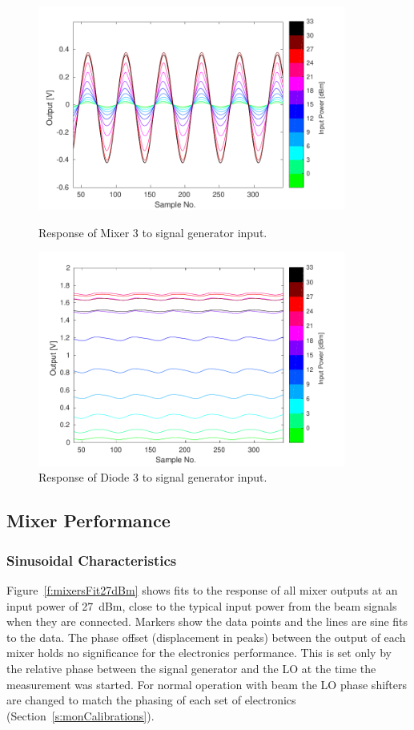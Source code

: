 \begin{figure}
  \centering
  \includegraphics[width=0.9\textwidth]{Figures/phaseMons/Mixer3_AllPowerLevels}
  \caption{Response of Mixer 3 to signal generator input.}
  \label{f:sigGenAllMix3}
  \includegraphics[width=0.9\textwidth]{Figures/phaseMons/Diode3_AllPowerLevels}
  \caption{Response of Diode 3 to signal generator input.}
  \label{f:sigGenAllDio3}
\end{figure}

\subsection{Mixer Performance}
\label{ss:sigGenMixer}

\subsubsection{Sinusoidal Characteristics}

Figure~\ref{f:mixersFit27dBm} shows fits to the response of all mixer outputs at an input power of 27~dBm, close to the typical input power from the beam signals when they are connected. Markers show the data points and the lines are sine fits to the data. The phase offset (displacement in peaks) between the output of each mixer holds no significance for the electronics performance. This is set only by the relative phase between the signal generator and the LO at the time the measurement was started. For normal operation with beam the LO phase shifters are changed to match the phasing of each set of electronics (Section~\ref{s:monCalibrations}).

